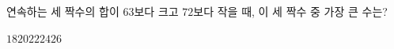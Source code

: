 연속하는 세 짝수의 합이 $63$보다 크고 $72$보다 작을 때, 이 세 짝수 중 가장 큰 수는?
\begin{choices32}{$18$}{$20$}{$22$}{$24$}{$26$}\end{choices32}
